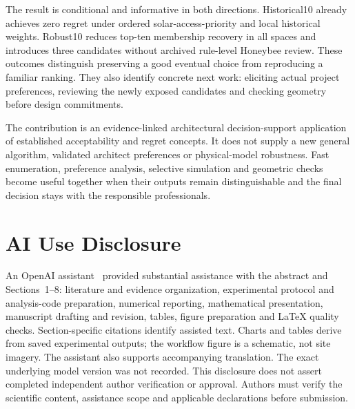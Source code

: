 \documentclass{llncs}
\begin{document}
The result is conditional and informative in both directions. Historical10 already achieves zero regret under ordered solar-access-priority and local historical weights. Robust10 reduces top-ten membership recovery in all spaces and introduces three candidates without archived rule-level Honeybee review. These outcomes distinguish preserving a good eventual choice from reproducing a familiar ranking. They also identify concrete next work: eliciting actual project preferences, reviewing the newly exposed candidates and checking geometry before design commitments.

The contribution is an evidence-linked architectural decision-support application of established acceptability and regret concepts. It does not supply a new general algorithm, validated architect preferences or physical-model robustness. Fast enumeration, preference analysis, selective simulation and geometric checks become useful together when their outputs remain distinguishable and the final decision stays with the responsible professionals.

\section*{AI Use Disclosure}
An OpenAI assistant~\cite{openai2026} provided substantial assistance with the abstract and Sections~1--8: literature and evidence organization, experimental protocol and analysis-code preparation, numerical reporting, mathematical presentation, manuscript drafting and revision, tables, figure preparation and LaTeX quality checks. Section-specific citations identify assisted text. Charts and tables derive from saved experimental outputs; the workflow figure is a schematic, not site imagery. The assistant also supports accompanying translation. The exact underlying model version was not recorded. This disclosure does not assert completed independent author verification or approval. Authors must verify the scientific content, assistance scope and applicable declarations before submission.
\FloatBarrier

\end{document}
